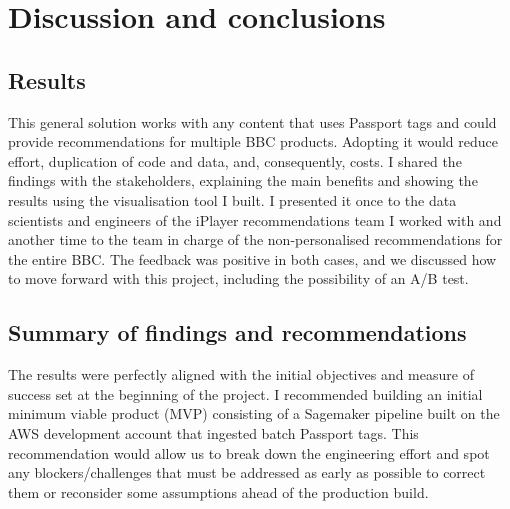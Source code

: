 \section{Discussion and conclusions}

\subsection{Results}

This general solution works with any content that uses Passport tags and could provide recommendations for multiple BBC products.
Adopting it would reduce effort, duplication of code and data, and, consequently, costs.
I shared the findings with the stakeholders,
explaining the main benefits and showing the results using the visualisation tool I built.
I presented it once to the data scientists and engineers of the iPlayer recommendations team
I worked with and another time to the team in charge of the non-personalised recommendations for the entire BBC.
The feedback was positive in both cases, and we discussed how to move forward with this project,
including the possibility of an A/B test.

\subsection{Summary of findings and recommendations}

The results were perfectly aligned with the initial objectives and measure of success set at the beginning of the project.
I recommended building an initial minimum viable product (MVP) consisting of a Sagemaker pipeline
built on the AWS development account that ingested batch Passport tags.
This recommendation would allow us to break down the engineering effort and spot any blockers/challenges that must be addressed
as early as possible to correct them or reconsider some assumptions ahead of the production build.

